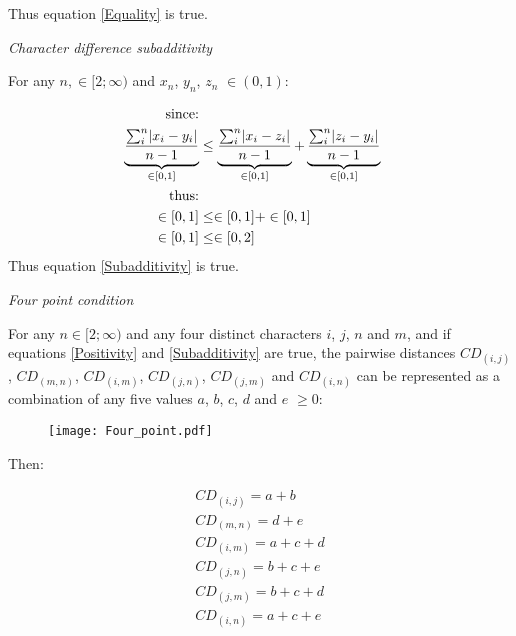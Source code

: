\documentclass[12pt,letterpaper]{article}
\DeclarePairedDelimiter\abs{\lvert}{\rvert}%
\renewcommand{\subsection}[1]{%
\bigskip
\begin{center}
\begin{large}
\normalfont\itshape #1
\end{large}
\end{center}}
\begin{document}
Thus equation \ref{Equality} is true.

\subsection{Character difference subadditivity}

For any $n, \in [2;\infty)$ and $x_{n}$, $y_{n}$, $z_{n}$ $\in (0,1)$:

\begin{equation}
    \label{equality_demo}
    \begin{aligned}
    \text{since:}\\
    \underbrace{\frac{\sum_{i}^{n}\abs{x_{i}-y_{i}}}{n-1}}_{\in[0,1]}
    &\leq
    \underbrace{\frac{\sum_{i}^{n}\abs{x_{i}-z_{i}}}{n-1}}_{\in[0,1]}
    +
    \underbrace{\frac{\sum_{i}^{n}\abs{z_{i}-y_{i}}}{n-1}}_{\in[0,1]}\\
    \text{thus:}\\
    \in[0,1] &\leq \in[0,1] + \in[0,1] \\
    \in[0,1] &\leq \in[0,2]\\
    \end{aligned}
\end{equation}
Thus equation \ref{Subadditivity} is true.


\newpage

\subsection{Four point condition}

For any $n \in [2;\infty)$ and any four distinct characters $i$, $j$, $n$ and $m$, and if equations \ref{Positivity} and \ref{Subadditivity} are true, the pairwise distances $CD_{(i,j)}$, $CD_{(m,n)}$, $CD_{(i,m)}$, $CD_{(j,n)}$, $CD_{(j,m)}$ and $CD_{(i,n)}$ can be represented as a combination of any five values $a$, $b$, $c$, $d$ and $e$ $\geq 0$:

\begin{figure}[!htbp]
\centering
   \texttt{[image: Four\_point.pdf]}
\end{figure}

Then:

\begin{equation}
    \begin{aligned}
    CD_{(i,j)} = a + b \\
    CD_{(m,n)} = d + e \\
    CD_{(i,m)} = a + c + d \\
    CD_{(j,n)} = b + c + e \\
    CD_{(j,m)} = b + c + d \\
    CD_{(i,n)} = a + c + e \\
    \end{aligned}
\end{equation}
\end{document}
